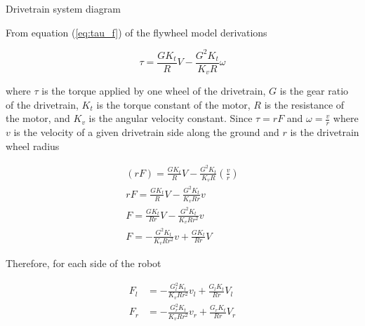 \begin{bookfigure}

  \caption{Drivetrain system diagram}
  \label{fig:drivetrain}
\end{bookfigure}

From equation (\ref{eq:tau_f}) of the flywheel model derivations

\begin{equation}
  \tau = \frac{GK_t}{R} V - \frac{G^2K_t}{K_v R} \omega
    \label{eq:drivetrain_tau}
\end{equation}

where $\tau$ is the torque applied by one wheel of the drivetrain, $G$ is the
gear ratio of the drivetrain, $K_t$ is the torque constant of the motor, $R$ is
the resistance of the motor, and $K_v$ is the angular velocity constant. Since
$\tau = rF$ and $\omega = \frac{v}{r}$ where $v$ is the velocity of a given
drivetrain side along the ground and $r$ is the drivetrain wheel radius

\begin{align*}
  (rF) = \frac{GK_t}{R} V - \frac{G^2K_t}{K_v R} \left(\frac{v}{r}\right) \\
  rF = \frac{GK_t}{R} V - \frac{G^2K_t}{K_v Rr} v \\
  F = \frac{GK_t}{Rr} V - \frac{G^2K_t}{K_v Rr^2} v \\
  F = -\frac{G^2K_t}{K_v Rr^2} v + \frac{GK_t}{Rr} V
\end{align*}

Therefore, for each side of the robot

\begin{align*}
  F_l &= -\frac{G_l^2 K_t}{K_v R r^2} v_l + \frac{G_l K_t}{Rr} V_l \\
  F_r &= -\frac{G_r^2 K_t}{K_v R r^2} v_r + \frac{G_r K_t}{Rr} V_r
\end{align*}

